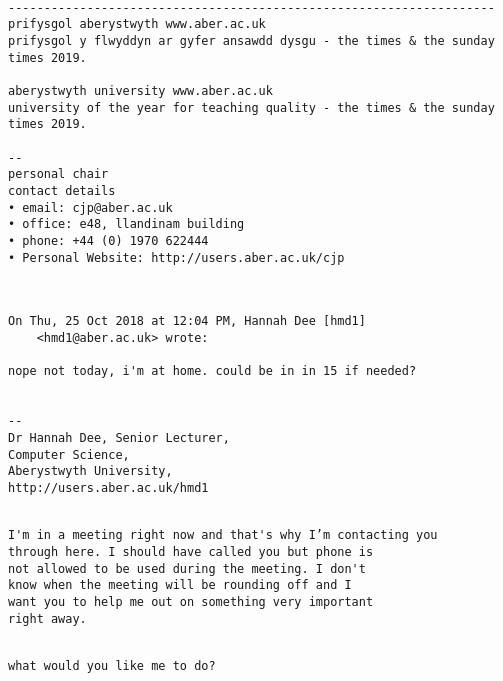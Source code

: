 \documentclass[xcolor=table]{beamer}
\begin{document}
\begin{frame}[fragile]
\begin{small}
	\begin{verbatim}

--------------------------------------------------------------------
prifysgol aberystwyth www.aber.ac.uk
prifysgol y flwyddyn ar gyfer ansawdd dysgu - the times & the sunday times 2019.

aberystwyth university www.aber.ac.uk
university of the year for teaching quality - the times & the sunday times 2019. 

-- 
personal chair
contact details
• email: cjp@aber.ac.uk
• office: e48, llandinam building
• phone: +44 (0) 1970 622444
• Personal Website: http://users.aber.ac.uk/cjp
	\end{verbatim}
\end{small}
\end{frame}

\begin{frame}[fragile]
\begin{small}
	\begin{verbatim}


On Thu, 25 Oct 2018 at 12:04 PM, Hannah Dee [hmd1]
	<hmd1@aber.ac.uk> wrote:

nope not today, i'm at home. could be in in 15 if needed?


-- 
Dr Hannah Dee, Senior Lecturer,
Computer Science,
Aberystwyth University,
http://users.aber.ac.uk/hmd1

	\end{verbatim}
\end{small}
\end{frame}

\begin{frame}[fragile]
\begin{small}
	\begin{verbatim}

I'm in a meeting right now and that's why I’m contacting you
through here. I should have called you but phone is
not allowed to be used during the meeting. I don't
know when the meeting will be rounding off and I
want you to help me out on something very important
right away.

	\end{verbatim}
\end{small}
\end{frame}


\begin{frame}[fragile]
\begin{small}
	\begin{verbatim}

what would you like me to do?


	\end{verbatim}
\end{small}
\end{frame}
\end{document}
